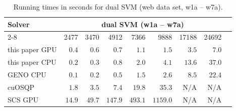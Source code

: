 
\begin{table}[h!]
\begin{center}
\small
  \begin{tabular}{l*{8}{r}}
    \toprule
    \multirow{2}{*}{Solver} & \multicolumn{7}{c}{dual SVM (w1a – w7a)} \\
    \cmidrule{2-8}
    & 2477 & 3470 & 4912 & 7366 & 9888 & 17188 & 24692 \\
    \midrule
    this paper GPU & $0.4$ & $0.6$ & $0.7$ & $1.1$ & $1.5$ & $3.5$ & $7.0$ \\
    this paper CPU & $0.2$ & $0.3$ & $0.8$ & $2.0$ & $4.1$ & $13.6$ & $37.0$ \\
    GENO CPU & $0.1$ & $0.2$ & $0.5$ & $1.5$ & $2.6$ & $8.5$ & $22.4$ \\
    cuOSQP & $1.8$ & $3.5$ & $7.4$ & $19.8$ & $35.3$ & N/A & N/A \\
    SCS GPU & $14.9$ & $49.7$ & $147.9$ & $493.1$ & $1159.0$ & N/A & N/A \\
    \bottomrule
  \end{tabular}%
  \caption{Running times in seconds for dual SVM (web data set, w1a – w7a).}
  \end{center}
\end{table}
